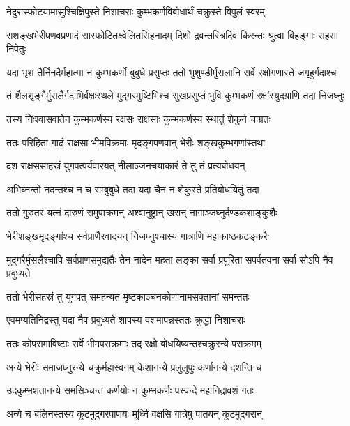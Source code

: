 \twolineshloka
{नेदुरास्फोटयामासुश्चिक्षिपुस्ते निशाचराः}
{कुम्भकर्णविबोधार्थं चक्रुस्ते विपुलं स्वरम्} %

\twolineshloka
{सशङ्खभेरीपणवप्रणादं सास्फोटितक्ष्वेलितसिंहनादम्}
{दिशो द्रवन्तस्त्रिदिवं किरन्तः श्रुत्वा विहङ्गाः सहसा निपेतुः} %

\twolineshloka
{यदा भृशं तैर्निनदैर्महात्मा न कुम्भकर्णो बुबुधे प्रसुप्तः}
{ततो भुशुण्डीर्मुसलानि सर्वे रक्षोगणास्ते जगृहुर्गदाश्च} %

\twolineshloka
{तं शैलशृङ्गैर्मुसलैर्गदाभिर्वक्षःस्थले मुद्गरमुष्टिभिश्च}
{सुखप्रसुप्तं भुवि कुम्भकर्णं रक्षांस्युदग्राणि तदा निजघ्नुः} %

\twolineshloka
{तस्य निःश्वासवातेन कुम्भकर्णस्य रक्षसः}
{राक्षसाः कुम्भकर्णस्य स्थातुं शेकुर्न चाग्रतः} %

\twolineshloka
{ततः परिहिता गाढं राक्षसा भीमविक्रमाः}
{मृदङ्गपणवान् भेरीः शङ्खकुम्भगणांस्तथा} %

\twolineshloka
{दश राक्षससाहस्रं युगपत्पर्यवारयत्}
{नीलाञ्जनचयाकारं ते तु तं प्रत्यबोधयन्} %

\twolineshloka
{अभिघ्नन्तो नदन्तश्च न च सम्बुबुधे तदा}
{यदा चैनं न शेकुस्ते प्रतिबोधयितुं तदा} %

\twolineshloka
{ततो गुरुतरं यत्नं दारुणं समुपाक्रमन्}
{अश्वानुष्ट्रान् खरान् नागाञ्जघ्नुर्दण्डकशाङ्कुशैः} %

\twolineshloka
{भेरीशङ्खमृदङ्गांश्च सर्वप्राणैरवादयन्}
{निजघ्नुश्चास्य गात्राणि महाकाष्ठकटङ्करैः} %

\threelineshloka
{मुद्गरैर्मुसलैश्चापि सर्वप्राणसमुद्यतैः}
{तेन नादेन महता लङ्का सर्वा प्रपूरिता}
{सपर्वतवना सर्वा सोऽपि नैव प्रबुध्यते} %

\twolineshloka
{ततो भेरीसहस्रं तु युगपत् समहन्यत}
{मृष्टकाञ्चनकोणानामसक्तानां समन्ततः} %

\twolineshloka
{एवमप्यतिनिद्रस्तु यदा नैव प्रबुध्यते}
{शापस्य वशमापन्नस्ततः क्रुद्धा निशाचराः} %

\twolineshloka
{ततः कोपसमाविष्टाः सर्वे भीमपराक्रमाः}
{तद् रक्षो बोधयिष्यन्तश्चक्रुरन्ये पराक्रमम्} %

\twolineshloka
{अन्ये भेरीः समाजघ्नुरन्ये चक्रुर्महास्वनम्}
{केशानन्ये प्रलुलुपुः कर्णानन्ये दशन्ति च} %

\twolineshloka
{उदकुम्भशतानन्ये समसिञ्चन्त कर्णयोः}
{न कुम्भकर्णः पस्पन्दे महानिद्रावशं गतः} %

\twolineshloka
{अन्ये च बलिनस्तस्य कूटमुद्गरपाणयः}
{मूर्ध्नि वक्षसि गात्रेषु पातयन् कूटमुद्गरान्} %

